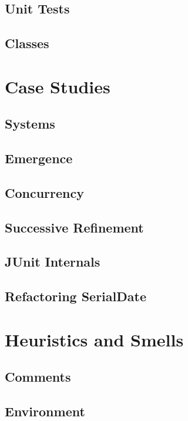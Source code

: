 \documentclass[a4paper, twocolumn]{article}
\begin{document}
\subsection{Unit Tests}

\subsection{Classes}


\section{Case Studies}

\subsection{Systems}

\subsection{Emergence}

\subsection{Concurrency}

\subsection{Successive Refinement}

\subsection{JUnit Internals}

\subsection{Refactoring SerialDate}


\section{Heuristics and Smells}

\subsection{Comments}

\subsection{Environment}
\end{document}
